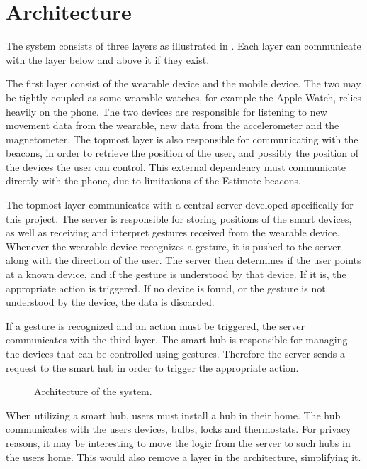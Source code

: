 \section{Architecture}
The system consists of three layers as illustrated in . 
Each layer can communicate with the layer below and above it if they exist.

The first layer consist of the wearable device and the mobile device. 
The two may be tightly coupled as some wearable watches, 
for example the Apple Watch, relies heavily on the phone. 
The two devices are responsible for listening to new movement data from the wearable, 
\eg new data from the accelerometer and the magnetometer. 
The topmost layer is also responsible for communicating with the beacons, 
in order to retrieve the position of the user, 
and possibly the position of the devices the user can control. 
This external dependency must communicate directly with the phone, 
due to limitations of the Estimote beacons.

The topmost layer communicates with a central server developed specifically for this project. 
The server is responsible for storing positions of the smart devices, 
as well as receiving and interpret gestures received from the wearable device.
Whenever the wearable device recognizes a gesture, 
it is pushed to the server along with the direction of the user.
The server then determines if the user points at a known device, 
and if the gesture is understood by that device. 
If it is, the appropriate action is triggered. 
If no device is found, 
or the gesture is not understood by the device, 
the data is discarded.


If a gesture is recognized and an action must be triggered, 
the server communicates with the third layer. 
The smart hub is responsible for managing the devices that can be controlled using gestures. 
Therefore the server sends a request to the smart hub in order to trigger the appropriate action.

\begin{figure}[h]
  \centering
  
  \caption{Architecture of the system.}
  \label{fig:architecture}
\end{figure}

When utilizing a smart hub, users must install a hub in their home. 
The hub communicates with the users devices, \eg bulbs, locks and thermostats. 
For privacy reasons, it may be interesting to move the logic from the server to such hubs in the users home. 
This would also remove a layer in the architecture, simplifying it.

